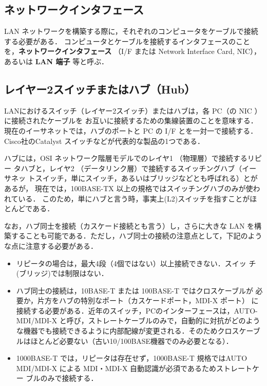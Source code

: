 \subsection*{ネットワークインタフェース}
\label{subsec:02:nic} 
LAN ネットワークを構築する際に，それぞれのコンピュータをケーブルで接続する必要がある．
 コンピュータとケーブルを接続するインタフェースのことを，{\bf ネットワークインタフェース} （I/F または Network
Interface Card, NIC），あるいは {\bf LAN 端子} 等と呼ぶ．

\subsection*{レイヤー2スイッチまたはハブ（Hub）}
\label{subsec:02:hub}
LANにおけるスイッチ（レイヤー2スイッチ）またはハブは，各 PC（の NIC ）に接続されたケーブルを
お互いに接続するための集線装置のことを意味する．
現在のイーサネットでは，ハブのポートと PC の I/F とを一対一で接続する．
Cisco社のCatalyst スイッチなどが代表的な製品の1つである．

ハブには，OSI ネットワーク階層モデルでのレイヤ1 （物理層）で接続するリピー
タハブと，レイヤ2 （データリンク層）で接続するスイッチングハブ（イーサネッ
トスイッチ，単にスイッチ，あるいはブリッジなどとも呼ばれる）とがあるが，
現在では，100BASE-TX 以上の規格ではスイッチングハブのみが使われている．
このため，単にハブと言う時，事実上(L2)スイッチを指すことがほとんどである．

なお，ハブ同士を接続（カスケード接続とも言う）し，さらに大きな LAN を構
築することも可能である．ただし，ハブ同士の接続の注意点として，下記のよう
な点に注意する必要がある．

\begin{itemize}
 \item リピータの場合は，最大4段（4個ではない）以上接続できない．スイッ
       チ(ブリッジ)では制限はない．
 \item ハブ同士の接続は，10BASE-T または 100BASE-T ではクロスケーブルが
       必要か，片方をハブの特別なポート（カスケードポート，MDI-X ポート）
       に接続する必要がある．近年のスイッチ，PCのインターフェースは，AUTO-MDI/MDI-X と呼び，ストレートケーブルのみで，自動的に対抗がどのような機器でも接続できるように内部配線が変更される．そのためクロスケーブルはほとんど必要ない（古い10/100BASE機器でのみ必要となる）．
 \item 1000BASE-T では，リピータは存在せず，1000BASE-T 規格ではAUTO
       MDI/MDI-X による MDI・MDI-X 自動認識が必須であるためストレートケー
       ブルのみで接続する．
\end{itemize}

